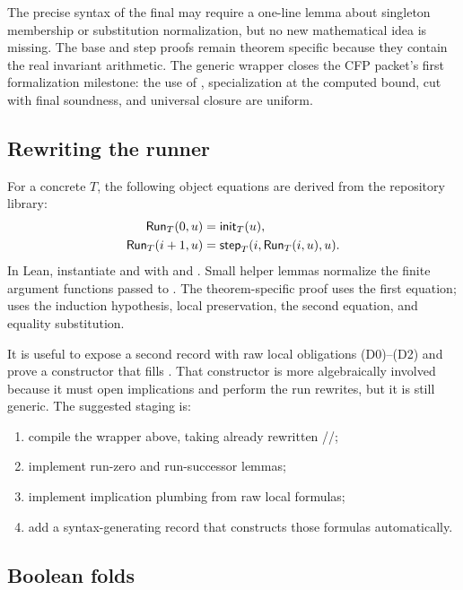 The precise syntax of the final  may require a one-line lemma about singleton membership or substitution normalization, but no new mathematical idea is missing.  The base and step proofs remain theorem specific because they contain the real invariant arithmetic.  The generic wrapper closes the CFP packet's first formalization milestone: the use of , specialization at the computed bound, cut with final soundness, and universal closure are uniform.

\subsection{Rewriting the runner}

For a concrete $T$, the following object equations are derived from the repository library:
\begin{align*}
 \mathsf{Run}_T(0,u)&=\mathsf{init}_T(u),\\
 \mathsf{Run}_T(i+1,u)&=\mathsf{step}_T(i,\mathsf{Run}_T(i,u),u).
\end{align*}
In Lean, instantiate  and  with  and .  Small helper lemmas normalize the finite argument functions passed to .  The theorem-specific  proof uses the first equation;  uses the induction hypothesis, local preservation, the second equation, and equality substitution.

It is useful to expose a second record with raw local obligations (D0)--(D2) and prove a constructor that fills .  That constructor is more algebraically involved because it must open implications and perform the run rewrites, but it is still generic.  The suggested staging is:
\begin{enumerate}[label=\arabic*.]
\item compile the wrapper above, taking already rewritten //;
\item implement run-zero and run-successor lemmas;
\item implement implication plumbing from raw local formulas;
\item add a syntax-generating record that constructs those formulas automatically.
\end{enumerate}

\subsection{Boolean folds}

